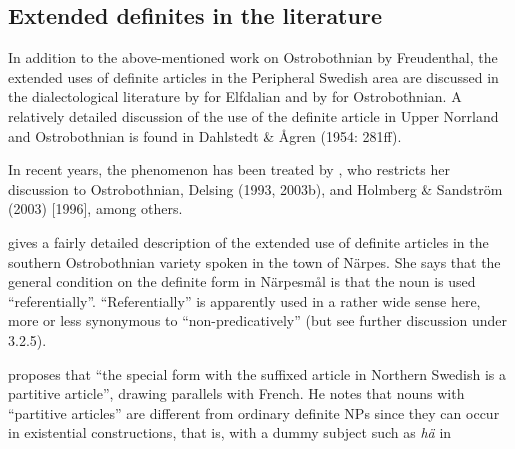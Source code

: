 
\subsection{\rmfamily Extended definites in the literature}

In addition to the above-mentioned work on Ostrobothnian by Freudenthal, the extended uses of definite articles in the Peripheral Swedish area are discussed in the dialectological literature by \citet{Levander1909} for Elfdalian and by \citet{Hummelstedt1934} for Ostrobothnian. A relatively detailed discussion of the use of the definite article in Upper Norrland and Ostrobothnian is found in Dahlstedt \& Ågren (1954: 281ff). 


In recent years, the phenomenon has been treated by \citet{Nikula1997}, who restricts her discussion to Ostrobothnian, Delsing (1993, 2003b), and Holmberg \& Sandström (2003) [1996], among others.


\citet{Nikula1997} gives a fairly detailed description of the extended use of definite articles in the southern Ostrobothnian variety spoken in the town of Närpes. She says that the general condition on the definite form in Närpesmål is that the noun is used “referentially”. “Referentially” is apparently used in a rather wide sense here, more or less synonymous to “non-predicatively” (but see further discussion under 3.2.5). 


\citet[50]{Delsing1993} proposes that “the special form with the suffixed article in Northern Swedish is a partitive article”, drawing parallels with French. He notes that nouns with “partitive articles” are different from ordinary definite NPs since they can occur in existential constructions, that is, with a dummy subject such as \textit{hä} in 


